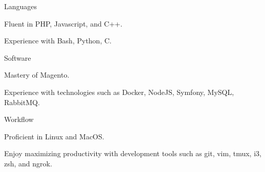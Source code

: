 \begin{cvskills}
  \cvskill
    {Languages}
    {
      \begin{cvitems}
        \item Fluent in PHP, Javascript, and C++.
        \item Experience with Bash, Python, C.
      \end{cvitems}
    }
  \cvskill
    {Software}
    {
      \begin{cvitems}
        \item Mastery of Magento.
        \item Experience with technologies such as Docker, NodeJS, Symfony, MySQL, RabbitMQ.
      \end{cvitems}
    }
  \cvskill
    {Workflow}
    {
      \begin{cvitems}
        \item Proficient in Linux and MacOS.
        \item Enjoy maximizing productivity with development tools such as git, vim, tmux, i3, zsh, and ngrok.
      \end{cvitems}
    }
\end{cvskills}
